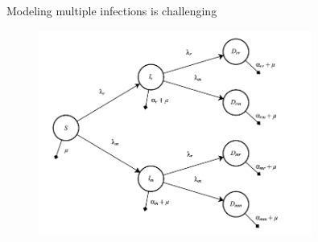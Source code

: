 \documentclass{beamer}
\begin{document}
\begin{frame}{Modeling multiple infections is challenging}
    \begin{figure}
        \centering
            \includegraphics[width=0.8\textwidth]{2022-07-10-22-37-45.png}
    \end{figure}
    \centering
    \vfill
    \tiny{\cite{Alizon_van_Baalen_2008}}
    
\end{frame}
\end{document}
